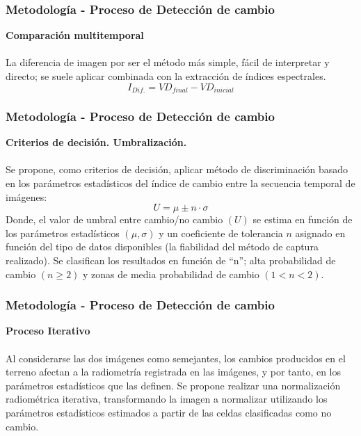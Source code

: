\documentclass[xcolor=table]{beamer}
\begin{document}
\begin{frame}
	\frametitle{Metodolog\'ia - Proceso de Detecci\'on de cambio}
	\textbf{Comparaci\'on multitemporal}\\~\\	
	La diferencia de imagen por ser el m\'etodo más simple, f\'acil de interpretar y directo; se suele aplicar combinada con la extracci\'on de \'indices espectrales.
	\begin{equation}
	I_{Dif.}=VD_{final}-VD_{inicial}
	\end{equation}

\end{frame}
\begin{frame}
	\frametitle{Metodolog\'ia - Proceso de Detecci\'on de cambio}
	\textbf{Criterios de decisi\'on. Umbralizaci\'on.}\\~\\	
Se propone, como criterios de decisi\'on, aplicar m\'etodo de discriminaci\'on basado en los par\'ametros estad\'isticos del \'indice de cambio entre la secuencia temporal de im\'agenes:
	\begin{equation}
U=\mu\pm n\cdot\sigma
	\end{equation}
	Donde, el valor de umbral entre cambio/no cambio $(U)$ se estima en funci\'on de los par\'ametros estad\'isticos $(\mu,\sigma) $ y un coeficiente de tolerancia $ n $ asignado en funci\'on del tipo de datos disponibles (la fiabilidad del m\'etodo de captura realizado). Se clasifican los resultados en funci\'on de “n”; alta probabilidad de cambio $ (n\geq2) $  y zonas de media probabilidad de cambio $ (1<n<2) $.
	
\end{frame}
\begin{frame}
	\frametitle{Metodolog\'ia - Proceso de Detecci\'on de cambio}
	\textbf{Proceso Iterativo}\\~\\	
Al considerarse las dos im\'agenes como semejantes, los cambios producidos en el terreno afectan a la radiometr\'ia registrada en las im\'agenes, y por tanto, en los par\'ametros estad\'isticos que las definen.
Se propone realizar una normalizaci\'on radiom\'etrica iterativa, transformando la imagen a normalizar utilizando los par\'ametros estad\'isticos estimados a partir de las celdas clasificadas como no cambio. 
\end{frame}
\end{document}
